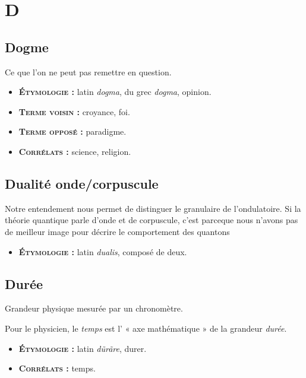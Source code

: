 \chapter{D}
\section{Dogme}

Ce que l'on ne peut pas remettre en question.

{\footnotesize
\begin{itemize}[leftmargin=1cm, label=, itemsep=1pt]
\item {\bf \textsc{Étymologie} :} latin {\it dogma}, du grec {\it dogma}, opinion.
\item {\bf \textsc{Terme voisin} :} croyance, foi.
\item {\bf \textsc{Terme opposé} :} paradigme.
\item {\bf \textsc{Corrélats} :} science, religion.
\end{itemize}
}

\section{Dualité onde/corpuscule}

Notre entendement nous permet de distinguer le granulaire de l'ondulatoire.
Si la théorie quantique parle d'onde et de corpuscule,
c'est parceque nous n'avons pas de meilleur image pour décrire le comportement des quantons

{\footnotesize
\begin{itemize}[leftmargin=1cm, label=, itemsep=1pt]
\item {\bf \textsc{Étymologie} :} latin {\it dualis}, composé de deux.
\end{itemize}
}

\section{Durée}

Grandeur physique mesurée par un chronomètre.

Pour le physicien, le {\it temps} est l' « axe mathématique »
de la grandeur {\it durée}.

{\footnotesize
\begin{itemize}[leftmargin=1cm, label=, itemsep=1pt]
\item {\bf \textsc{Étymologie} :} latin {\it d\~{u}r\~{a}re}, durer.
\item {\bf \textsc{Corrélats} :} temps.
\end{itemize}
}
